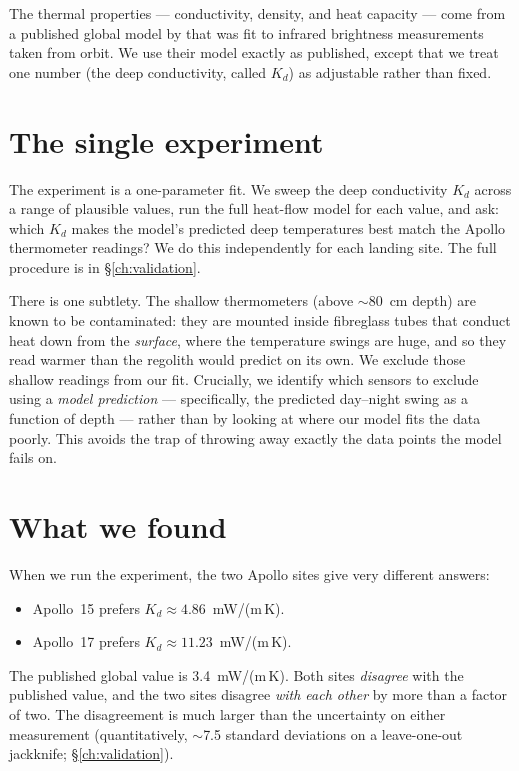 \documentclass[11pt]{report}
\begin{document}
The thermal properties --- conductivity, density, and heat capacity
--- come from a published global model by \citet{hayne2017} that was
fit to infrared brightness measurements taken from orbit. We use
their model exactly as published, except that we treat one number
(the deep conductivity, called $K_d$) as adjustable rather than
fixed.

\section{The single experiment}

The experiment is a one-parameter fit. We sweep the deep
conductivity $K_d$ across a range of plausible values, run the full
heat-flow model for each value, and ask: which $K_d$ makes the
model's predicted deep temperatures best match the Apollo
thermometer readings? We do this independently for each landing
site. The full procedure is in \S\ref{ch:validation}.

There is one subtlety. The shallow thermometers (above
$\sim$80~cm depth) are known to be contaminated: they are mounted
inside fibreglass tubes that conduct heat down from the
\emph{surface}, where the temperature swings are huge, and so they
read warmer than the regolith would predict on its own. We exclude
those shallow readings from our fit. Crucially, we identify which
sensors to exclude using a \emph{model prediction} --- specifically,
the predicted day--night swing as a function of depth --- rather than
by looking at where our model fits the data poorly. This avoids the
trap of throwing away exactly the data points the model fails on.

\section{What we found}

When we run the experiment, the two Apollo sites give very different
answers:

\begin{itemize}\itemsep2pt
  \item Apollo~15 prefers $K_d \approx 4.86$~mW/(m\,K).
  \item Apollo~17 prefers $K_d \approx 11.23$~mW/(m\,K).
\end{itemize}

The published global value is 3.4~mW/(m\,K). Both sites
\emph{disagree} with the published value, and the two sites disagree
\emph{with each other} by more than a factor of two. The disagreement
is much larger than the uncertainty on either measurement
(quantitatively, $\sim$7.5 standard deviations on a leave-one-out
jackknife; \S\ref{ch:validation}).
\end{document}
